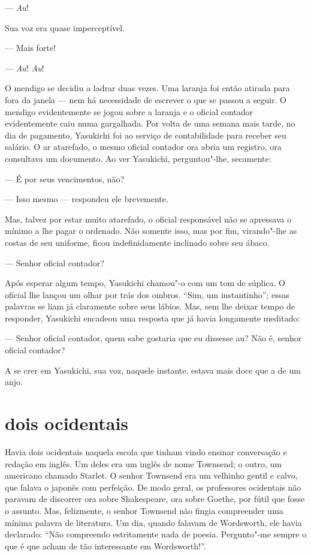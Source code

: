--- \textit{Au}!

Sua voz era quase imperceptível.

--- Mais forte!

--- \textit{Au}! \textit{Au}!

O mendigo se decidiu a ladrar duas vezes. Uma laranja foi então atirada
para fora da janela --- nem há necessidade de escrever o que se passou a
seguir. O mendigo evidentemente se jogou sobre a laranja e o oficial
contador evidentemente caiu numa gargalhada. Por volta de uma semana
mais tarde, no dia de pagamento, Yasukichi foi ao serviço de
contabilidade para receber seu salário. O ar atarefado, o mesmo oficial
contador ora abria um registro, ora consultava um documento. Ao ver
Yasukichi, perguntou"-lhe, secamente:

--- É por seus vencimentos, não?

--- Isso mesmo --- respondeu ele brevemente.

Mas, talvez por estar muito atarefado, o oficial responsável não se
apressava o mínimo a lhe pagar o ordenado. Não somente isso, mas por
fim, virando"-lhe as costas de seu uniforme, ficou indefinidamente
inclinado sobre seu ábaco.

--- Senhor oficial contador?

Após esperar algum tempo, Yasukichi chamou"-o com um tom de súplica. O
oficial lhe lançou um olhar por trás dos ombros. ``Sim, um instantinho'';
essas palavras se liam já claramente sobre seus lábios. Mas, sem lhe
deixar tempo de responder, Yasukichi encadeou uma resposta que já havia
longamente meditado:

--- Senhor oficial contador, quem sabe gostaria que eu dissesse au? Não é,
senhor oficial contador?

A se crer em Yasukichi, sua voz, naquele instante, estava mais doce que
a de um anjo.

\section*{dois ocidentais}

Havia dois ocidentais naquela escola que tinham vindo ensinar
conversação e redação em inglês. Um deles era um inglês de nome
Townsend; o outro, um americano chamado Starlet. O senhor Townsend era
um velhinho gentil e calvo, que falava o japonês com perfeição. De modo
geral, os professores ocidentais não paravam de discorrer ora sobre
Shakespeare, ora sobre Goethe, por fútil que fosse o assunto. Mas,
felizmente, o senhor Townsend não fingia compreender uma mínima palavra
de literatura. Um dia, quando falavam de Wordsworth, ele havia
declarado: ``Não compreendo estritamente nada de poesia. Pergunto"-me
sempre o que é que acham de tão interessante em Wordsworth!''.

